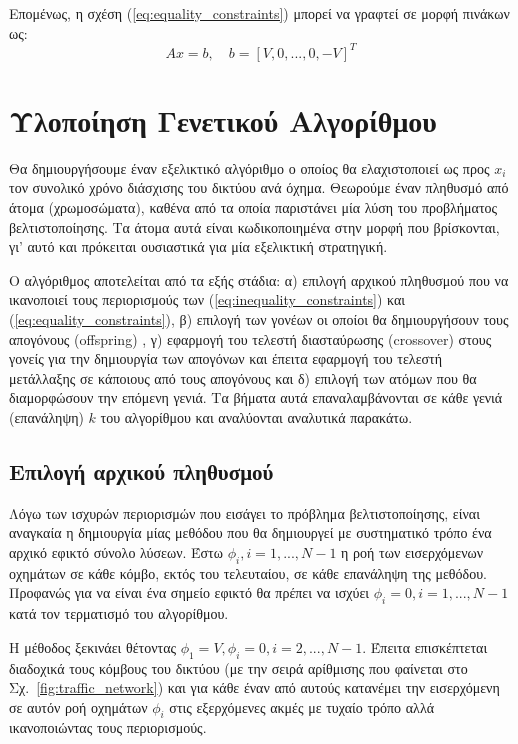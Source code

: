 \documentclass[a4paper,12pt]{article}
\begin{document}
Επομένως, η σχέση (\ref{eq:equality_constraints}) μπορεί να γραφτεί σε μορφή πινάκων ως:
\begin{equation}
    A x = b, \quad b = [V,0,...,0,-V]^T
    \label{eq:equality_constraints_matrix_form}
\end{equation}

\newpage

\section{Υλοποίηση Γενετικού Αλγορίθμου}

Θα δημιουργήσουμε έναν εξελικτικό αλγόριθμο ο οποίος θα ελαχιστοποιεί ως προς $x_i$ τον συνολικό χρόνο διάσχισης 
του δικτύου ανά όχημα. Θεωρούμε έναν πληθυσμό από άτομα (χρωμοσώματα), καθένα από τα οποία παριστάνει μία λύση του
προβλήματος βελτιστοποίησης. Τα άτομα αυτά είναι κωδικοποιημένα στην μορφή που βρίσκονται, γι' αυτό και πρόκειται 
ουσιαστικά για μία εξελικτική στρατηγική. 

Ο αλγόριθμος αποτελείται από τα εξής στάδια: 
α) επιλογή αρχικού πληθυσμού που να ικανοποιεί τους περιορισμούς των (\ref{eq:inequality_constraints}) και 
(\ref{eq:equality_constraints}),
β) επιλογή των γονέων οι οποίοι θα δημιουργήσουν τους απογόνους (offspring)
,
γ) εφαρμογή του τελεστή διασταύρωσης (crossover) στους γονείς 
για την δημιουργία των απογόνων και έπειτα εφαρμογή του τελεστή μετάλλαξης σε κάποιους από τους απογόνους και
δ) επιλογή των ατόμων που θα διαμορφώσουν την επόμενη γενιά. 
Τα βήματα αυτά επαναλαμβάνονται σε κάθε γενιά (επανάληψη) $k$ του αλγορίθμου και αναλύονται αναλυτικά παρακάτω.

\subsection{Επιλογή αρχικού πληθυσμού}
Λόγω των ισχυρών περιορισμών που εισάγει το πρόβλημα βελτιστοποίησης, είναι αναγκαία η δημιουργία μίας μεθόδου
που θα δημιουργεί με συστηματικό τρόπο ένα αρχικό εφικτό σύνολο λύσεων. Έστω $\phi_i, i=1,...,N-1$ η ροή των 
εισερχόμενων οχημάτων σε κάθε κόμβο, εκτός του τελευταίου, σε κάθε επανάληψη της μεθόδου. Προφανώς για να είναι 
ένα σημείο εφικτό θα πρέπει να ισχύει $\phi_i = 0, i=1,...,N-1$ κατά τον τερματισμό του αλγορίθμου.

Η μέθοδος ξεκινάει θέτοντας $\phi_1 = V, \phi_i = 0, i=2,...,N-1$. Έπειτα επισκέπτεται διαδοχικά 
τους κόμβους του δικτύου (με την σειρά αρίθμισης που φαίνεται στο Σχ.~\ref{fig:traffic_network}) και για κάθε έναν
από αυτούς κατανέμει την εισερχόμενη σε αυτόν ροή οχημάτων $\phi_i$ στις εξερχόμενες ακμές με τυχαίο τρόπο αλλά 
ικανοποιώντας τους περιορισμούς. 
\end{document}
